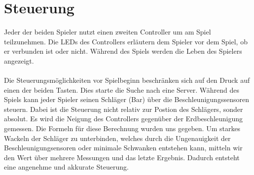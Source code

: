 \section*{Steuerung}

\paragraph*{}
Jeder der beiden Spieler nutzt einen zweiten Controller um am Spiel teilzunehmen. Die LEDs des Controllers erläutern dem Spieler vor dem Spiel, ob er verbunden ist oder nicht. Während des Spiels werden die Leben des Spielers angezeigt. 

\paragraph*{}
Die Steuerungsmöglichkeiten vor Spielbeginn beschränken sich auf den Druck auf einen der beiden Tasten. Dies starte die Suche nach eine Server. Während des Spiels kann jeder Spieler seinen Schläger (Bar) über die Beschleunigungssensoren steuern. Dabei ist die Steuerung nicht relativ zur Postion des Schlägers, sonder absolut. Es wird die Neigung des Controllers gegenüber der Erdbeschleunigung gemessen. Die Formeln für diese Berechnung wurden uns gegeben. Um starkes Wackeln der Schläger zu unterbinden, welches durch die Ungenauigkeit der Beschleunigungsensoren oder minimale Schwanken entstehen kann, mitteln wir den Wert über mehrere Messungen und das letzte Ergebnis. Dadurch entsteht eine angenehme und akkurate Steuerung.


